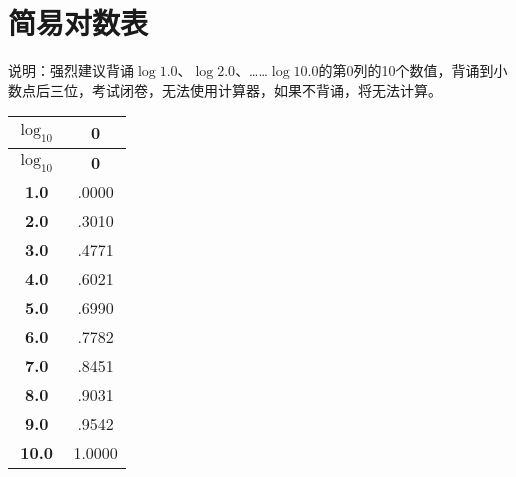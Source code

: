 \section{简易对数表}

说明：强烈建议背诵$\log 1.0$、$\log 2.0$、……$\log 10.0$的第0列的10个数值，背诵到小数点后三位，考试闭卷，无法使用计算器，如果不背诵，将无法计算。

\begin{longtable}[c]{|c|c|}
\hline
$\log_{10}$ & \textbf{0} \\
\hline
\endfirsthead
\hline
$\log_{10}$ & \textbf{0} \\
\endhead
\textbf{1.0} & .0000 \\ \hline
\textbf{2.0} & .3010 \\ \hline
\textbf{3.0} & .4771 \\ \hline
\textbf{4.0} & .6021 \\ \hline
\textbf{5.0} & .6990 \\ \hline
\textbf{6.0} & .7782 \\ \hline
\textbf{7.0} & .8451 \\ \hline
\textbf{8.0} & .9031 \\ \hline
\textbf{9.0} & .9542 \\ \hline
\textbf{10.0} & 1.0000 \\ \hline
\end{longtable}


